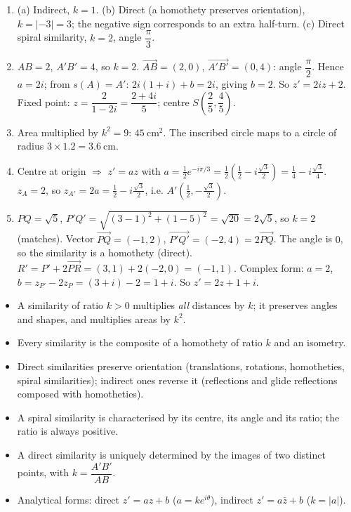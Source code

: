\documentclass[11pt]{article}
\begin{document}
\begin{corrige}
\begin{enumerate}
\item (a) Indirect, $k = 1$. (b) Direct (a homothety preserves orientation), $k = |-3| = 3$; the negative sign corresponds to an extra half-turn. (c) Direct spiral similarity, $k = 2$, angle $\dfrac{\pi}{3}$.
\item $AB = 2$, $A'B' = 4$, so $k = 2$. $\vec{AB} = (2,0)$, $\vec{A'B'} = (0,4)$: angle $\dfrac{\pi}{2}$. Hence $a = 2i$; from $s(A) = A'$: $2i(1+i) + b = 2i$, giving $b = 2$. So $z' = 2iz + 2$. Fixed point: $z = \dfrac{2}{1 - 2i} = \dfrac{2 + 4i}{5}$; centre $S\left(\dfrac{2}{5}, \dfrac{4}{5}\right)$.
\item Area multiplied by $k^2 = 9$: $45\ \mathrm{cm}^2$. The inscribed circle maps to a circle of radius $3 \times 1.2 = 3.6\ \mathrm{cm}$.
\item Centre at origin $\Rightarrow$ $z' = a z$ with $a = \frac{1}{2} e^{-i\pi/3} = \frac{1}{2}\left(\frac{1}{2} - i\frac{\sqrt{3}}{2}\right) = \frac{1}{4} - i\frac{\sqrt{3}}{4}$. $z_A = 2$, so $z_{A'} = 2a = \frac{1}{2} - i\frac{\sqrt{3}}{2}$, i.e. $A'\left(\frac{1}{2}, -\frac{\sqrt{3}}{2}\right)$.
\item $PQ = \sqrt{5}$, $P'Q' = \sqrt{(3-1)^2 + (1-5)^2} = \sqrt{20} = 2\sqrt{5}$, so $k=2$ (matches). Vector $\vec{PQ} = (-1, 2)$, $\vec{P'Q'} = (-2, 4) = 2\vec{PQ}$. The angle is $0$, so the similarity is a homothety (direct). $R' = P' + 2\vec{PR} = (3,1) + 2(-2,0) = (-1, 1)$. Complex form: $a=2$, $b = z_{P'} - 2z_P = (3+i) - 2 = 1+i$. So $z' = 2z + 1 + i$.
\end{enumerate}
\end{corrige}

\begin{aretenir}
\begin{itemize}
\item A similarity of ratio $k > 0$ multiplies \emph{all} distances by $k$; it preserves angles and shapes, and multiplies areas by $k^2$.
\item Every similarity is the composite of a homothety of ratio $k$ and an isometry.
\item Direct similarities preserve orientation (translations, rotations, homotheties, spiral similarities); indirect ones reverse it (reflections and glide reflections composed with homotheties).
\item A spiral similarity is characterised by its centre, its angle and its ratio; the ratio is always positive.
\item A direct similarity is uniquely determined by the images of two distinct points, with $k = \dfrac{A'B'}{AB}$.
\item Analytical forms: direct $z' = az+b$ ($a=k e^{i\theta}$), indirect $z' = a\bar{z}+b$ ($k=|a|$).
\end{itemize}
\end{aretenir}
\end{document}

